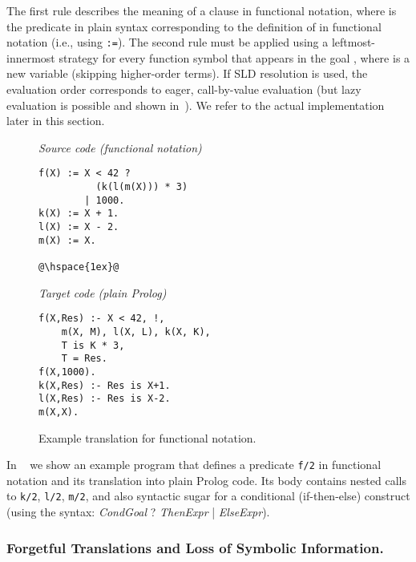 \documentclass[preprint]{llncs}
\renewcommand\cref[1]{\Cref{#1}}
\newcommand{\pre}[1]{\texttt{#1}}
\begin{document}
The first rule describes the meaning of a clause in functional
notation, where  is the predicate in plain syntax 
corresponding to the definition of  in functional notation (i.e.,
using \texttt{:=}). The second 
rule must be applied using a leftmost-innermost strategy for every 
function symbol that appears in the goal , where  is a new
variable (skipping higher-order terms).
If SLD resolution is used, the evaluation order corresponds to eager,
call-by-value evaluation (but lazy evaluation is possible and shown
in~\cite{functional-lazy-notation-flops2006}). 
We refer to the actual implementation later in this section.

\begin{figure}[t]
  \centering\small
  \begin{minipage}{0.45\linewidth}
    \emph{Source code (functional notation)}
\begin{lstlisting}[numbers=none,frame=r]
f(X) := X < 42 ?          
          (k(l(m(X))) * 3)
        | 1000.           
k(X) := X + 1.
l(X) := X - 2.
m(X) := X.

@\hspace{1ex}@
\end{lstlisting}
  \end{minipage}
  \hspace{1ex}
  \begin{minipage}{0.45\linewidth}
    \emph{Target code (plain Prolog)}
\begin{lstlisting}[numbers=none,frame=none]
f(X,Res) :- X < 42, !, 
    m(X, M), l(X, L), k(X, K),
    T is K * 3,
    T = Res.
f(X,1000).
k(X,Res) :- Res is X+1. 
l(X,Res) :- Res is X-2.
m(X,X).
\end{lstlisting}
  \end{minipage}
  \caption{Example translation for functional notation.}
  \label{fig:functional}
\end{figure}

\begin{example}
\label{ex:ex0}
  In ~\cref{fig:functional} we show an example program that defines a
  predicate \pre{f/2} in functional notation and its translation into
  plain Prolog code. Its body contains nested calls to \pre{k/2},
  \pre{l/2}, \pre{m/2}, and also syntactic sugar for a conditional
  (if-then-else) construct (using the syntax: \textit{CondGoal} \textrm{?}
    \textit{ThenExpr} \textrm{|} \emph{ElseExpr}). 
\end{example}

\subsubsection{Forgetful Translations and Loss of Symbolic Information.}
\label{sec:background:translation}
\end{document}
